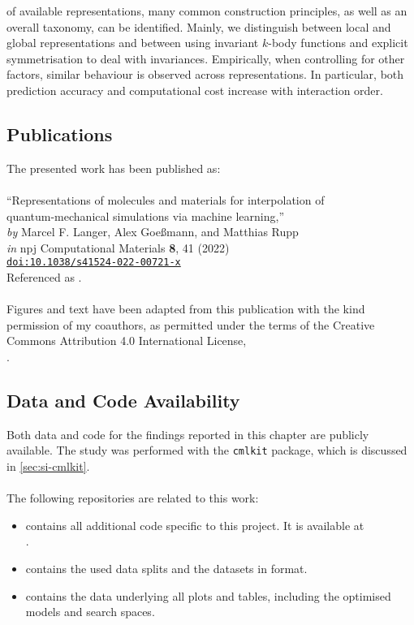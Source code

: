  of available representations, many common construction principles, as well as an overall taxonomy, can be identified. Mainly, we distinguish between local and global representations and between using invariant $k$-body functions and explicit symmetrisation to deal with invariances.
Empirically, when controlling for other factors,
similar behaviour is observed across representations. In particular, both prediction accuracy and computational cost increase with interaction order.

\clearpage
\subsection*{Publications}
The presented work has been published as:\\\\
``Representations of molecules and materials for interpolation of\\ quantum-mechanical simulations via machine learning,''\\
\textit{by} Marcel F. Langer, Alex Goeßmann, and Matthias Rupp\\
\textit{in} npj Computational Materials \textbf{8}, 41 (2022)\\
\href{https://doi.org/10.1038/s41524-022-00721-x}{\texttt{doi:10.1038/s41524-022-00721-x}}\\
Referenced as \cite{lgr2022q}.
\\\\
Figures and text have been adapted from this publication with the kind permission of my coauthors, as permitted under the terms of the Creative Commons Attribution 4.0 International License,\\
.


\subsection*{Data and Code Availability}
Both data and code for the findings reported in this chapter are publicly available.
The study was performed with the \texttt{cmlkit} package, which is discussed in \cref{sec:si-cmlkit}.
\\\\
The following repositories are related to this work:
\begin{itemize}
  \item {} contains all additional code specific to this project. It is available at\\ .
  \item {} contains the used data splits and the datasets in \cmlkit format.
  \item {} contains the data underlying all plots and tables, including the optimised models and \hp search spaces.
\end{itemize}
